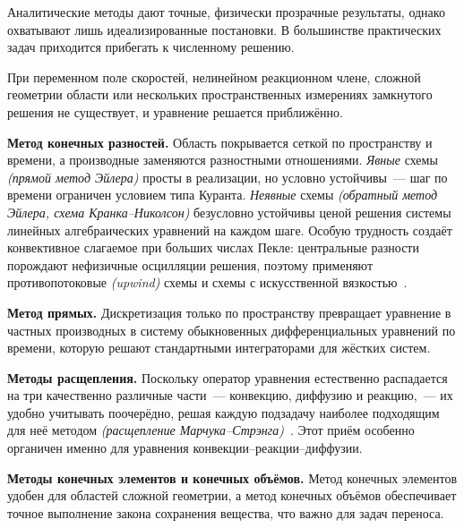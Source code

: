         Аналитические методы дают точные, физически прозрачные результаты, однако
        охватывают лишь идеализированные постановки. В большинстве практических задач
        приходится прибегать к численному решению.


        При переменном поле скоростей, нелинейном реакционном члене, сложной геометрии
        области или нескольких пространственных измерениях замкнутого решения не существует,
        и уравнение решается приближённо.

        \textbf{Метод конечных разностей.}
        Область покрывается сеткой по пространству и времени, а производные заменяются
        разностными отношениями. \textit{Явные} схемы \textit{(прямой метод Эйлера)} просты
        в реализации, но условно устойчивы~--- шаг по времени ограничен условием типа
        Куранта. \textit{Неявные} схемы \textit{(обратный метод Эйлера, схема Кранка--Николсон)}
        безусловно устойчивы ценой решения системы линейных алгебраических уравнений
        на каждом шаге. Особую трудность создаёт конвективное слагаемое при больших
        числах Пекле: центральные разности порождают нефизичные осцилляции решения,
        поэтому применяют противопотоковые \textit{(upwind)} схемы и схемы с искусственной
        вязкостью~\cite{samarskii1977}.

        \textbf{Метод прямых.}
        Дискретизация только по пространству превращает уравнение в частных производных
        в систему обыкновенных дифференциальных уравнений по времени, которую решают
        стандартными интеграторами для жёстких систем.

        \textbf{Методы расщепления.}
        Поскольку оператор уравнения естественно распадается на три качественно различные
        части~--- конвекцию, диффузию и реакцию,~--- их удобно учитывать поочерёдно,
        решая каждую подзадачу наиболее подходящим для неё методом
        \textit{(расщепление Марчука--Стрэнга)}~\cite{marchukSplitting1988}. Этот приём
        особенно органичен именно для уравнения конвекции--реакции--диффузии.

        \textbf{Методы конечных элементов и конечных объёмов.}
        Метод конечных элементов удобен для областей сложной геометрии, а метод конечных
        объёмов обеспечивает точное выполнение закона сохранения вещества, что важно
        для задач переноса.


